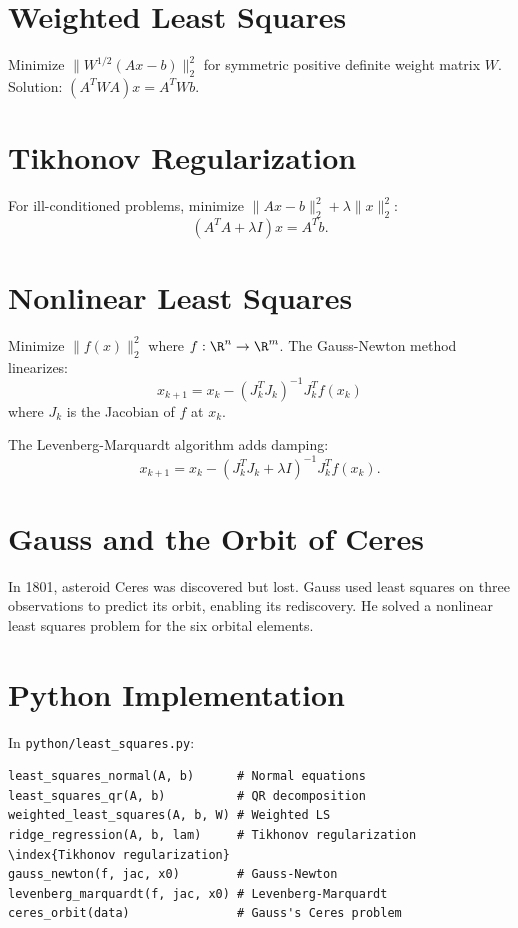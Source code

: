 \section{Weighted Least Squares}

Minimize $\|W^{1/2}(Ax - b)\|_2^2$ for symmetric positive definite weight matrix $W$. Solution: $(A^T W A)x = A^T W b$.

\section{Tikhonov Regularization}

For ill-conditioned problems, minimize $\|Ax - b\|_2^2 + \lambda \|x\|_2^2$:
\[
(A^T A + \lambda I)x = A^T b.
\]

\section{Nonlinear Least Squares}

Minimize $\|f(x)\|_2^2$ where $f: \R^n \to \R^m$. The Gauss-Newton method  linearizes:
\[
x_{k+1} = x_k - (J_k^T J_k)^{-1} J_k^T f(x_k)
\]
where $J_k$ is the Jacobian of $f$ at $x_k$.

The Levenberg-Marquardt algorithm adds damping:
\[
x_{k+1} = x_k - (J_k^T J_k + \lambda I)^{-1} J_k^T f(x_k).
\]

\section{Gauss and the Orbit of Ceres}

In 1801, asteroid Ceres was discovered but lost. Gauss used least squares on three observations to predict its orbit, enabling its rediscovery. He solved a nonlinear least squares problem for the six orbital elements.

\section{Python Implementation}

In \texttt{python/least\_squares.py}:

\begin{lstlisting}[style=python, caption={Key functions in python/least\_squares.py}]
least_squares_normal(A, b)      # Normal equations
least_squares_qr(A, b)          # QR decomposition
weighted_least_squares(A, b, W) # Weighted LS
ridge_regression(A, b, lam)     # Tikhonov regularization \index{Tikhonov regularization}
gauss_newton(f, jac, x0)        # Gauss-Newton
levenberg_marquardt(f, jac, x0) # Levenberg-Marquardt
ceres_orbit(data)               # Gauss's Ceres problem
\end{lstlisting}

